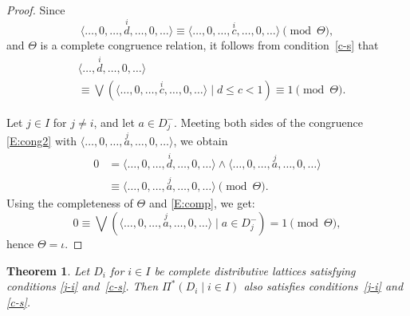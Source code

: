 \documentclass{amsart}
\theoremstyle{plain}
\newtheorem{theorem}{Theorem}
\theoremstyle{definition}
\theoremstyle{remark}
\numberwithin{equation}{section}
\begin{document}
\begin{proof} 
   Since 
   \begin{equation}\label{E:cong2}
      \langle \dots, 0, \dots, \overset{i}{d}, \dots, 0, 
         \dots \rangle \equiv \langle \dots, 0, \dots, 
         \overset{i}{c}, \dots, 0, \dots \rangle \pmod{\Theta}, 
   \end{equation}
   and $\Theta$ is a complete congruence relation, it follows from 
   condition~\eqref{c-s} that
   \begin{equation}\label{E:cong}
   \begin{split}
       &\langle \dots, \overset{i}{d}, \dots, 0,
          \dots \rangle\\
       &\equiv \bigvee ( \langle \dots, 0, \dots, 
         \overset{i}{c}, \dots, 0, \dots \rangle \mid d \leq c < 1 ) 
         \equiv 1 \pmod{\Theta}. 
   \end{split}
   \end{equation}

   Let $j \in I$ for $j \neq i$, and let $a \in D_{j}^{-}$. 
   Meeting both sides of the congruence \eqref{E:cong2} with 
   $\langle \dots, 0, \dots, \overset{j}{a}, \dots, 0, \dots \rangle$, 
   we obtain
 \begin{equation}\label{E:comp}
   \begin{split}
      0 &= \langle \dots, 0, \dots, \overset{i}{d}, \dots, 0, \dots 
         \rangle \wedge \langle \dots, 0, \dots, \overset{j}{a}, \dots, 0, 
         \dots \rangle\\
          &\equiv \langle \dots, 0, \dots, \overset{j}{a}, \dots, 0, \dots 
         \rangle \pmod{\Theta}. 
   \end{split}
  \end{equation}
   Using the completeness of $\Theta$ and \eqref{E:comp}, we get:
   \[
      0 \equiv \bigvee ( \langle \dots, 0, \dots, \overset{j}{a}, 
      \dots, 0, \dots \rangle \mid a \in D_{j}^{-} ) = 1 \pmod{\Theta}, 
   \]
   hence $\Theta = \iota$.
\end{proof}

\begin{theorem}\label{T:P*a} 
   Let $D_{i}$ for $i \in I$ be complete distributive lattices
   satisfying conditions \eqref{j-i} and~\eqref{c-s}.  Then 
   $\Pi^{*} ( D_{i} \mid i \in I )$ also satisfies 
   conditions~\eqref{j-i} and \eqref{c-s}. 
\end{theorem}
\end{document}
